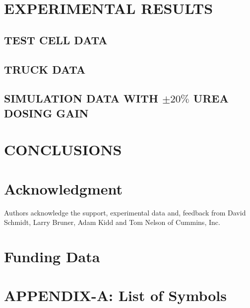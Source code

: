 \documentclass[subscriptcorrection,upint,varvw,barcolor=Goldenrod3,mathalfa=cal=euler,balance,hyphenate,french,pdf-a]{asmejour}
\begin{document}
\section{EXPERIMENTAL RESULTS}
\subsection{TEST CELL DATA}
\subsection{TRUCK DATA}
\subsection{SIMULATION DATA WITH $\pm 20\%$ UREA DOSING GAIN}

\section{CONCLUSIONS}

\section*{Acknowledgment}
Authors acknowledge the support, experimental data and, feedback from David Schmidt, Larry
Bruner, Adam Kidd and Tom Nelson of Cummins, Inc.
\section*{Funding Data}
\appendix   %
\section{APPENDIX-A: List of Symbols}



\end{document}
